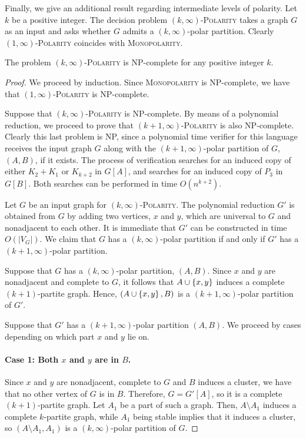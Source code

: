 Finally, we give an additional result regarding intermediate levels of polarity.
Let $k$ be a positive integer.   The decision problem
$(k,\infty)$-\textsc{Polarity} takes a graph $G$ as an input and asks whether
$G$ admits a $(k,\infty)$-polar partition.   Clearly
$(1,\infty)$-\textsc{Polarity} coincides with \textsc{Monopolarity}.

\begin{proposition}
\label{pro:np-hardness}
    The problem $(k,\infty)$-\textnormal{\scshape Polarity} is NP-complete for
    any positive integer $k$.
\end{proposition}

\begin{proof}
    We proceed by induction. Since \textsc{Monopolarity} is NP-complete, we have
    that $(1,\infty)$-\textsc{Polarity} is NP-complete.

    Suppose that $(k,\infty)$-\textsc{Polarity} is NP-complete. By means of a
    polynomial reduction, we proceed to prove that
    $(k+1,\infty)$-\textsc{Polarity} is also NP-complete. Clearly this last
    problem is NP, since a polynomial time verifier for this language receives
    the input graph $G$ along with the $(k+1,\infty)$-polar partition of $G$,
    $(A,B)$, if it exists. The process of verification searches for an induced
    copy of either $K_2 + K_1$ or $K_{k+2}$ in $G[A]$, and searches for an
    induced copy of $P_3$ in $G[B]$.  Both searches can be performed in time
    $O(n^{k+2})$.

    Let $G$ be an input graph for $(k,\infty)$-\textsc{Polarity}.  The
    polynomial reduction $G'$ is obtained from $G$ by adding two vertices, $x$
    and $y$, which are universal to $G$ and nonadjacent to each other.    It is
    immediate that $G'$ can be constructed in time $O(|V_G|)$. We claim that $G$
    has a $(k,\infty)$-polar partition if and only if $G'$ has a
    $(k+1,\infty)$-polar partition.

    Suppose that $G$ has a $(k,\infty)$-polar partition, $(A,B)$. Since $x$ and
    $y$ are nonadjacent and complete to $G$, it follows that $A\cup \left\{x,y\right\}$
    induces a complete $(k+1)$-partite graph. Hence, $(A\cup \left\{x,y\right\}, B)$ is a
    $(k+1,\infty)$-polar partition of $G'$.

    Suppose that $G'$ has a $(k+1,\infty)$-polar partition $(A,B)$. We proceed
    by cases depending on which part $x$ and $y$ lie on.

    \paragraph{Case 1: Both $x$ and $y$ are in $B$.} Since $x$ and $y$ are
    nonadjacent, complete to $G$ and $B$ induces a cluster, we have that no
    other vertex of $G$ is in $B$. Therefore, $G=G'[A]$, so it is a complete
    $(k+1)$-partite graph. Let $A_1$ be a part of such a graph. Then,
    $A\setminus A_1$ induces a complete $k$-partite graph, while $A_1$ being
    stable implies that it induces a cluster, so $(A\setminus A_1, A_1)$ is a
    $(k,\infty)$-polar partition of $G$.


\end{proof}
